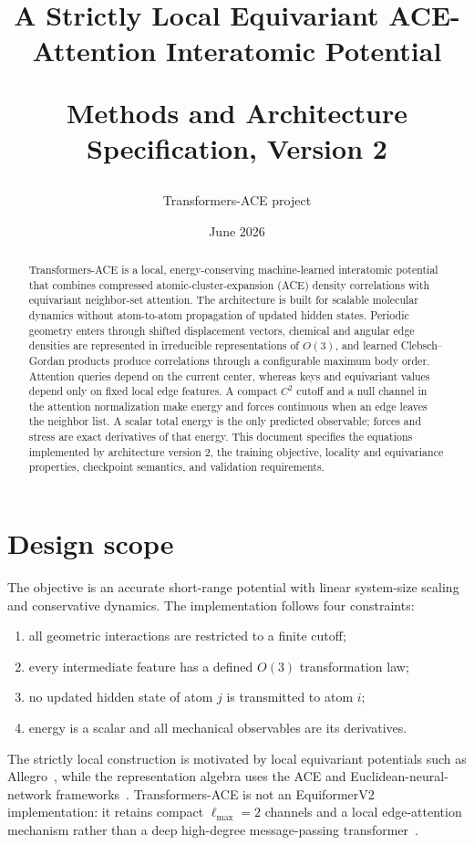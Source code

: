 \documentclass[10pt]{article}
\title{\vspace{-1.5em}{\LARGE\textbf{Transformers-ACE}}\par\vspace{0.35em}
{\large A Strictly Local Equivariant ACE-Attention Interatomic Potential}\par\vspace{0.4em}
{\normalsize Methods and Architecture Specification, Version 2}}
\author{Transformers-ACE project}
\date{June 2026}
\begin{document}
\maketitle

\begin{abstract}
Transformers-ACE is a local, energy-conserving machine-learned interatomic
potential that combines compressed atomic-cluster-expansion (ACE) density
correlations with equivariant neighbor-set attention. The architecture is built
for scalable molecular dynamics without atom-to-atom propagation of updated
hidden states. Periodic geometry enters through shifted displacement vectors,
chemical and angular edge densities are represented in irreducible
representations of $O(3)$, and learned Clebsch--Gordan products produce
correlations through a configurable maximum body order. Attention queries depend on the
current center, whereas keys and equivariant values depend only on fixed local
edge features. A compact $C^2$ cutoff and a null channel in the attention
normalization make energy and forces continuous when an edge leaves the neighbor
list. A scalar total energy is the only predicted observable; forces and stress
are exact derivatives of that energy. This document specifies the equations
implemented by architecture version 2, the training objective, locality and
equivariance properties, checkpoint semantics, and validation requirements.
\end{abstract}

\section{Design scope}

The objective is an accurate short-range potential with linear system-size
scaling and conservative dynamics. The implementation follows four constraints:
\begin{enumerate}
  \item all geometric interactions are restricted to a finite cutoff;
  \item every intermediate feature has a defined $O(3)$ transformation law;
  \item no updated hidden state of atom $j$ is transmitted to atom $i$;
  \item energy is a scalar and all mechanical observables are its derivatives.
\end{enumerate}
The strictly local construction is motivated by local equivariant potentials
such as Allegro~\cite{musaelian2023}, while the representation algebra uses the
ACE and Euclidean-neural-network frameworks~\cite{drautz2019,geiger2022}.
Transformers-ACE is not an EquiformerV2 implementation: it retains compact
$\ell_{\max}=2$ channels and a local edge-attention mechanism rather than a deep
high-degree message-passing transformer~\cite{liao2023}.
\end{document}
